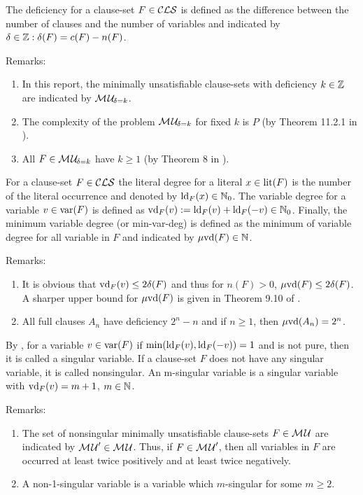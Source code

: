 \documentclass{report}
\begin{document}
\begin{defi}\label{def:deficiency}
The deficiency for a clause-set $F \in \mathcal{CLS}$ is defined as the difference between the number of clauses and the number of variables and indicated by $\delta \in \mathbb{Z}: \delta(F)= c(F) - n(F)$.
\end{defi}
Remarks:
  \begin{enumerate}
  \item In this report, the minimally unsatisfiable clause-sets with deficiency $k \in \mathbb{Z}$ are indicated by $\mathcal{M\hspace{0.8pt}U}_{\!\delta=k}$.
  \item The complexity of the problem $\mathcal{M\hspace{0.8pt}U}_{\!\delta=k}$ for fixed $k$ is $P$ (by Theorem 11.2.1 in \cite{h25}).
  \item All $F \in \mathcal{M\hspace{0.8pt}U}_{\!\delta=k}$ have $k \ge 1$ (by Theorem 8 in \cite{h32}).
  \end{enumerate}

\begin{defi}\label{def:degree}
For a clause-set $F \in \mathcal{CLS}$ the literal degree for a literal $x \in \operatorname{lit}(F)$ is the number of the literal occurrence and denoted by $\operatorname{ld}_F(x) \in \mathbb{N}_0$. The variable degree for a variable $v \in \operatorname{var}(F)$ is defined as $\operatorname{vd}_F(v) := \operatorname{ld}_F(v) + \operatorname{ld}_F(-v) \in \mathbb{N}_0$. Finally, the minimum variable degree (or min-var-deg) is defined as the minimum of variable degree for all variable in $F$ and indicated by $\operatorname{\mu\!\operatorname{vd}}(F) \in \mathbb{N}$.
\end{defi}
Remarks:
  \begin{enumerate}
  \item It is obvious that $\operatorname{vd}_F(v) \le 2 \delta(F)$ and thus for $n(F) >0$, $\operatorname{\mu\!\operatorname{vd}}(F) \le 2 \delta(F)$. A sharper upper bound for $\operatorname{\mu\!\operatorname{vd}}(F)$ is given in Theorem 9.10 of \cite{h9}.
  \item All full clauses $A_n$ have deficiency $2^n - n$ and if $n \ge 1$, then  $\operatorname{\mu\!\operatorname{vd}}(A_n) =2^n$.
    \end{enumerate}
\begin{defi}\label{def:singvar}
By \cite{h29}, for a variable $v \in \operatorname{var}(F)$ if $\min(\operatorname{ld}_F(v) ,\operatorname{ld}_F(-v))=1$ and is not pure, then it is called a singular variable. If a clause-set $F$ does not have any singular variable, it is called nonsingular. An m-singular variable is a singular variable with $\operatorname{vd}_F(v)=m+1$, $m \in \mathbb{N}$.
\end{defi}
Remarks:
  \begin{enumerate}
  \item The set of nonsingular minimally unsatisfiable clause-sets $F \in \mathcal{M\hspace{0.8pt}U}$ are indicated by $\mathcal{M\hspace{0.8pt}U}' \in \mathcal{M\hspace{0.8pt}U}$. Thus, if $F \in \mathcal{M\hspace{0.8pt}U}'$, then all variables in $F$ are occurred at least twice positively and at least twice negatively.
  \item A non-1-singular variable is a variable which $m$-singular for some $m \ge 2$.
   \end{enumerate}
 
\end{document}
